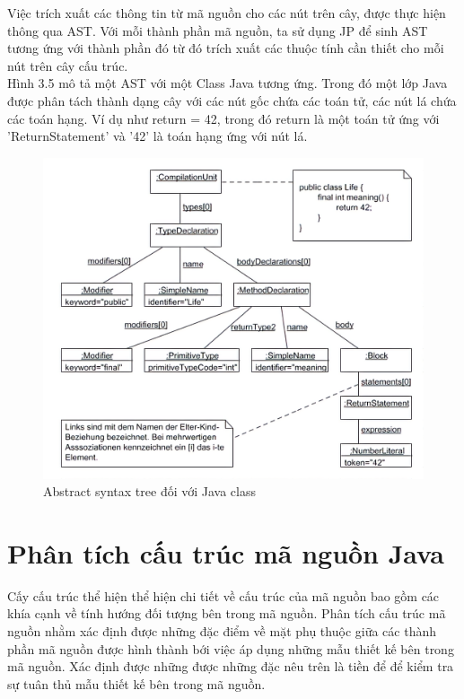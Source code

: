 \documentclass[12pt]{report}
\begin{document}
\noindent Việc trích xuất các thông tin từ mã nguồn cho các nút trên cây, được thực hiện thông qua AST. Với mỗi thành phần mã nguồn, ta sử dụng JP để sinh AST tương ứng với thành phần đó từ đó trích xuất các thuộc tính cần thiết cho mỗi nút trên cây cấu trúc.\\
Hình 3.5 mô tả một AST với một Class Java tương ứng. Trong đó một lớp Java được phân tách thành dạng cây với các nút gốc chứa các toán tử, các nút lá chứa các toán hạng. Ví dụ như return = 42, trong đó return là một toán tử ứng với 'ReturnStatement' và '42' là toán hạng ứng với nút lá.
\begin{figure}[!htbp]
	\centering
	\includegraphics[scale=1]{images/ast_class_java-boring}
	\caption{Abstract syntax tree đối với Java class}
	\label{fig:ast_for_java_class}
\end{figure}
\section{Phân tích cấu trúc mã nguồn Java}
\indent Cấy cấu trúc thể hiện thể hiện chi tiết về cấu trúc của mã nguồn bao gồm các khía cạnh về tính hướng đối tượng bên trong mã nguồn. Phân tích cấu trúc mã nguồn nhằm xác định được những đặc điểm về mặt phụ thuộc giữa các thành phần mã nguồn được hình thành bới việc áp dụng những mẫu thiết kế bên trong mã nguồn. Xác định được những được những đặc nêu trên là tiền để để kiểm tra sự tuân thủ mẫu thiết kế bên trong mã nguồn.
\end{document}
